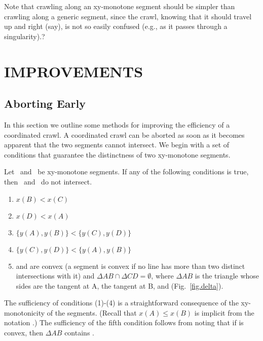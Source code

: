 {Note that crawling along an xy-monotone segment should be
simpler than crawling along a generic segment, since the crawl,
knowing that it should travel up and right (say), is not so easily confused
(e.g., as it passes through a singularity).?
}

\section{IMPROVEMENTS}
\label{sec.improve}

\subsection{Aborting Early}

In this section we outline some methods for improving the efficiency of a 
coordinated crawl.
A coordinated crawl can be aborted as soon as it becomes apparent that the two 
segments cannot intersect.
We begin with a set of conditions that guarantee the distinctness of two 
xy-monotone segments.

\begin{lemma}
\label{lem-badconds}
Let \ and \ be xy-monotone segments.
If any of the following conditions is true, then \ and \ do not
intersect.  
\begin{enumerate}
	\item $x(B) < x(C)$
	\item $x(D) < x(A)$
	\item $\{y(A),y(B)\} < \{y(C),y(D)\}$
	\item $\{y(C),y(D)\} < \{y(A),y(B)\}$
	\item {} and  are convex (a segment is convex if
			no line has more than two distinct intersections with it)
	    	and $\Delta AB \cap \Delta CD = \emptyset$, where
	$\Delta AB$ is the triangle whose sides are the tangent at 
	A, the tangent at B, and  (Fig.~\ref{fig.delta}).
\end{enumerate}
\end{lemma}
%
The sufficiency of conditions (1)-(4) is a straightforward consequence of the 
xy-monotonicity of the segments.
(Recall that $x(A) \leq x(B)$ is implicit 
	from the notation .)
The sufficiency of the fifth condition follows from noting that
if  is convex, then $\Delta AB$ contains .
\QED

